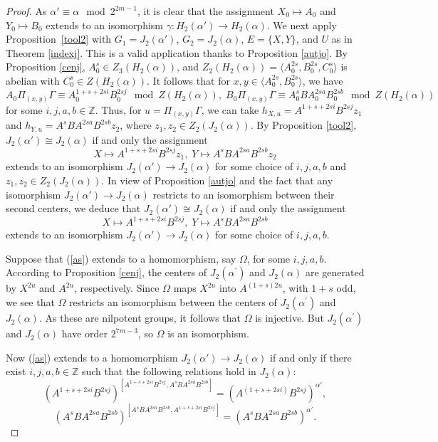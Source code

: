 \documentclass{amsart}
\theoremstyle{definition}
\theoremstyle{remark}
\newcommand \Z{{\mathbb Z}}
\begin{document}
\begin{proof} As $\alpha'\equiv\alpha\mod 2^{2m-1}$, it is clear that the assignment $X_0\mapsto A_0$ and $Y_0\mapsto B_0$
extends to an isomorphism $\gamma: H_2(\alpha')\to H_2(\alpha)$. We next apply Proposition~\ref{tool2}
with $G_1=J_2(\alpha')$, $G_2=J_2(\alpha)$, $E=\{X,Y\}$, and $U$ as in Theorem \ref{indexj}.
This is a valid application thanks to Proposition \ref{autjo}. By Proposition \ref{cenj},
$A_0^s\in Z_3(H_2(\alpha))$, and $Z_2(H_2(\alpha))=\langle  A_0^{2s},  B_0^{2s}, C_0^{s}\rangle$ is abelian
with $C_0^{s}\in Z(H_2(\alpha))$. It follows that for $x,y\in\langle A_0^{2s},B_0^{2s}\rangle$, we have
$$
A_0\Pi_{(x,y)}\Gamma\equiv A_0^{1+s+2si}B_0^{2sj}\mod Z(H_2(\alpha)),\;
B_0\Pi_{(x,y)}\Gamma\equiv A_0^s B A_0^{2sa}B_0^{2sb}\mod Z(H_2(\alpha))
$$
for some $i,j,a,b\in\Z$. Thus, for $u=\Pi_{(x,y)}\Gamma$, we can take $h_{X,u}=A^{1+s+2si}B^{2sj}z_1$
and $h_{Y,u}=A^s B A^{2sa}B^{2sb}z_2$, where $z_1,z_2\in Z_2(J_2(\alpha))$. By Proposition \ref{tool2},
$J_2(\alpha')\cong J_2(\alpha)$ if and only
the assignment
$$
X\mapsto A^{1+s+2si}B^{2sj}z_1,\;Y\mapsto A^s B A^{2sa}B^{2sb}z_2
$$
extends to an isomorphism $J_2(\alpha')\to J_2(\alpha)$ for some choice of $i,j,a,b$ and $z_1,z_2\in Z_2(J_2(\alpha))$.
In view of Proposition \ref{autjo} and the fact that any isomorphism $J_2(\alpha')\to J_2(\alpha)$ restricts to an isomorphism
between their second centers, we deduce that
$J_2(\alpha')\cong J_2(\alpha)$ if and only
the assignment
\begin{equation}
\label{as}
X\mapsto A^{1+s+2si}B^{2sj},\;Y\mapsto A^s B A^{2sa}B^{2sb}
\end{equation}
extends to an isomorphism $J_2(\alpha')\to J_2(\alpha)$ for some choice of $i,j,a,b$.

Suppose that (\ref{as}) extends to a homomorphism, say $\Omega$, for some $i,j,a,b$.
 According to Proposition \ref{cenj}, the centers of $J_2(\alpha^\prime)$ and $J_2(\alpha)$ are generated by
$X^{2u}$ and $A^{2u}$, respectively. Since $\Omega$ maps $X^{2u}$ into $A^{(1+s)2u}$, with $1+s$ odd, we see that $\Omega$
restricts an isomorphism between the centers of $J_2(\alpha^\prime)$ and $J_2(\alpha)$. As these are nilpotent groups,
it follows that $\Omega$ is injective.
But $J_2(\alpha^\prime)$ and $J_2(\alpha)$ have order $2^{7m-3}$, so $\Omega$ is an isomorphism.

Now (\ref{as}) extends to a homomorphism $J_2(\alpha')\to J_2(\alpha)$ if and only if there exist $i,j,a,b\in\Z$ such that
the following relations hold in $J_2(\alpha)$:
\begin{equation}
\label{poop}
(A^{1+s+2si}B^{2sj})^{[A^{1+s+2si}B^{2sj},A^s BA^{2sa}B^{2sb}]}=(A^{(1+s+2si)}B^{2sj})^{\alpha'},
\end{equation}
\begin{equation}
\label{poop2}
(A^s B A^{2sa}B^{2sb})^{[A^s BA^{2sa}B^{2sb},A^{1+s+2si}B^{2sj}]}=(A^sBA^{2sa}B^{2sb})^{\alpha'}.
\end{equation}


\end{proof}
\end{document}
